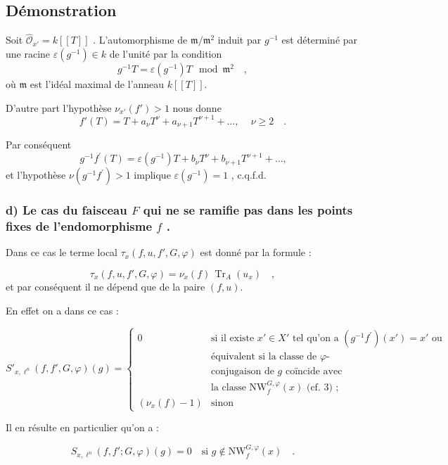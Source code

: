 \documentclass[11pt]{article}
\providecommand{\fm}{\mathfrak{m}}
\providecommand{\Tr}{\operatorname{Tr}}
\providecommand{\Tr}{\operatorname{Tr}}
\providecommand{\Tr}{\operatorname{Tr}}
\providecommand{\Tr}{\operatorname{Tr}}
\providecommand{\fm}{\mathfrak m}
\providecommand{\Tr}{\operatorname{Tr}}
\begin{document}
\subsection*{Démonstration}
Soit $\widehat{\mathcal{O}}_{x'} = k[[T]]$ . L'automorphisme de $\fm/\fm^2$ induit par $g^{-1}$ est déterminé par une racine $\varepsilon(g^{-1}) \in k$ de l'unité par la condition
\[
g^{-1}T = \varepsilon(g^{-1})T \mod \fm^2 \quad ,
\]
où $\fm$ est l'idéal maximal de l'anneau $k[[T]]$.

D'autre part l'hypothèse $\nu_{x'}(f') > 1$ nous donne
\[
f'(T) = T + a_\nu T^\nu + a_{\nu+1} T^{\nu+1} + \ldots \text{, } \quad \nu \geq 2 \quad .
\]

Par conséquent
\[
g^{-1}f^{\prime}(T) = \varepsilon(g^{-1})T + b_\nu T^\nu + b_{\nu+1} T^{\nu+1} + \ldots \text{,}
\]
et l'hypothèse $\nu(g^{-1}f^{\prime}) > 1$ implique $\varepsilon(g^{-1}) = 1$ , c.q.f.d.

\subsubsection*{d) Le cas du faisceau $F$ qui ne se ramifie pas dans les points fixes de l'endomorphisme $f$ .}

Dans ce cas le terme local $\tau_x(f,u, f', G, \varphi)$ est donné par la formule :

\begin{equation}\tag{6.4.6}
\tau_x(f,u, f', G, \varphi) = \nu_x(f) \, \Tr_A(u_x) \quad ,
\end{equation}
et par conséquent il ne dépend que de la paire $(f,u)$.

En effet on a dans ce cas :

\begin{equation}\tag{6.4.7}
S'_{x,\ell^n}(f, f', G, \varphi)(g) = \begin{cases}
0 & \text{si il existe } x' \in X' \text{ tel qu'on a } (g^{-1}f^{\prime})(x') = x' \text{ ou}\\
& \text{équivalent si la classe de $\varphi$-}\\
& \text{conjugaison de $g$ coïncide avec}\\
& \text{la classe } \mathrm{NW}_{f}^{G,\varphi}(x) \text{ (cf. 3) ;}\\
(\nu_x(f)-1) & \text{sinon}
\end{cases}
\end{equation}

Il en résulte en particulier qu'on a :

\begin{equation}\tag{6.4.8}
S_{x,\ell^n}(f, f'; G, \varphi)(g) = 0 \quad \text{si } g \notin \mathrm{NW}_{f}^{G,\varphi}(x) \quad .
\end{equation}
\end{document}
